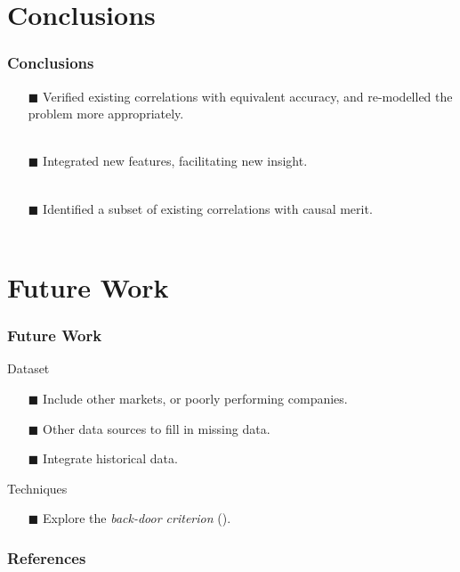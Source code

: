 \documentclass{beamer}
\begin{document}
\section {Conclusions}
\begin{frame}[t]
\frametitle{Conclusions}
\begin{enumerate}
\item [$\blacksquare$]  Verified existing correlations with equivalent accuracy, and re-modelled the problem more appropriately. \\~\\
\item [$\blacksquare$]  Integrated new features, facilitating new insight. \\~\\
\item [$\blacksquare$]  Identified a subset of existing correlations with causal merit. \\~\\
\end{enumerate}
\end{frame}
\section {Future Work}
\begin{frame}[t]
\frametitle{Future Work}
Dataset
\begin{enumerate}
\item [$\blacksquare$]  Include other markets, or poorly performing companies. \\
\item [$\blacksquare$]  Other data sources to fill in missing data. \\
\item [$\blacksquare$]  Integrate historical data.
\end{enumerate}
\vspace{0.7cm}
Techniques
\begin{enumerate}
\item [$\blacksquare$] Explore the {\it back-door criterion} (\cite{pearl2009causality}). \\
\end{enumerate}
\end{frame}
\begin{frame}[t,allowframebreaks]
\frametitle{References}

\end{frame}
\end{document}
